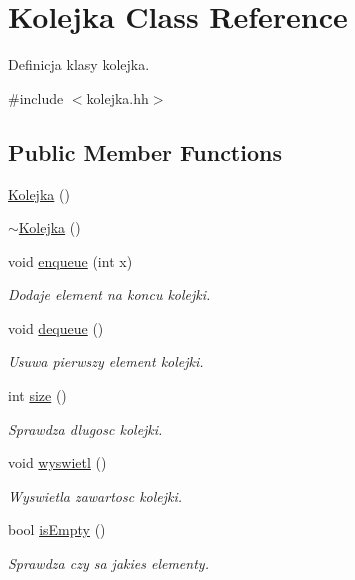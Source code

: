 \hypertarget{class_kolejka}{\section{\-Kolejka \-Class \-Reference}
\label{class_kolejka}
}


\-Definicja klasy kolejka.  




{\ttfamily \#include $<$kolejka.\-hh$>$}

\subsection*{\-Public \-Member \-Functions}
\begin{DoxyCompactItemize}
\item 
\hyperlink{class_kolejka_a37c886fdc73dce62b04da0381dec5484}{\-Kolejka} ()
\item 
\hyperlink{class_kolejka_a352f86ff08cd47be6c35c60bb0f873a6}{$\sim$\-Kolejka} ()
\item 
void \hyperlink{class_kolejka_a877d1afc5dcc780abbac06a0c4bd9d61}{enqueue} (int x)
\begin{DoxyCompactList}\small\item\em \-Dodaje element na koncu kolejki. \end{DoxyCompactList}\item 
void \hyperlink{class_kolejka_a9c78c81b3ef4d4d7a54215ab7fe380ff}{dequeue} ()
\begin{DoxyCompactList}\small\item\em \-Usuwa pierwszy element kolejki. \end{DoxyCompactList}\item 
int \hyperlink{class_kolejka_a82920d7b90e967a4d5e175a20fe6de68}{size} ()
\begin{DoxyCompactList}\small\item\em \-Sprawdza dlugosc kolejki. \end{DoxyCompactList}\item 
void \hyperlink{class_kolejka_a5426f165c02ad1e7928682c47127a084}{wyswietl} ()
\begin{DoxyCompactList}\small\item\em \-Wyswietla zawartosc kolejki. \end{DoxyCompactList}\item 
bool \hyperlink{class_kolejka_a0106bd9157a970b63a06edd1dad350a9}{is\-Empty} ()
\begin{DoxyCompactList}\small\item\em \-Sprawdza czy sa jakies elementy. \end{DoxyCompactList}\end{DoxyCompactItemize}


